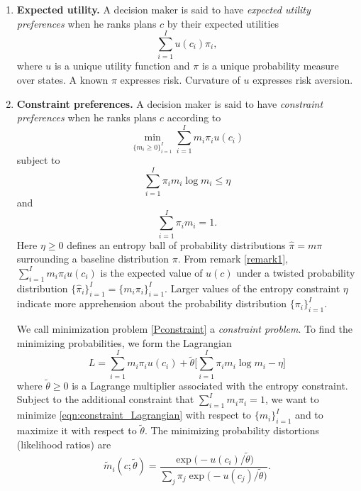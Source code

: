 \begin{enumerate}
\item\textbf{Expected utility.}
A decision maker is said to have \textit{expected
utility preferences} when he  ranks plans $c$ by  their expected utilities
\[ \sum_{i=1}^I u(c_i) \pi_i,  \]
where $u$ is a  unique utility function and $\pi$ is a  unique probability measure over states.  A known $\pi$ expresses risk.  Curvature of $u$ expresses risk aversion.

\item\textbf{Constraint preferences.} A decision maker  is said to have \textit{constraint preferences} when he ranks plans $c$ according to
\begin{equation}\label{Pconstraint}  \min_{\{m_i \geq 0\}_{i=1}^I}  \sum_{i=1}^I m_i\pi_i  u(c_i) \end{equation}
 subject to
\[\sum_{i=1}^I \pi_i m_i \log m_i \leq \eta \]
and
\[ \sum_{i=1}^I \pi_i m_i = 1 .\]
Here $\eta \geq 0$ defines an entropy ball of probability distributions $\hat \pi = m \pi$ surrounding
a baseline distribution $\pi$. From remark \ref{remark1},
$  \sum_{i=1}^I m_i\pi_i  u(c_i) $ is the expected value of $u(c)$ under a twisted  probability distribution $\{\hat \pi_i\}_{i=1}^I = \{m_i \pi_i\}_{i=1}^I$. Larger values of the entropy constraint $\eta$
 indicate more apprehension about the probability distribution $\{\pi_i\}_{i=1}^I$.

We call  minimization problem \eqref{Pconstraint} a \textit{constraint problem}. To find
 the minimizing probabilities, we  form the
Lagrangian
\begin{equation}\label{eqn:constraint_Lagrangian}
L = \sum_{i=1}^I m_i \pi_i u(c_i) +  \tilde \theta\bigl[\sum_{i=1}^I \pi_i m_i \log m_i - \eta \bigr]
\end{equation}
where $\tilde \theta \geq 0$ is a Lagrange multiplier associated with the entropy constraint.  Subject to the additional constraint that
$\sum_{i=1}^I m_i  \pi_i =1$, we want to  minimize \eqref{eqn:constraint_Lagrangian}
with respect to $\{m_i\}_{i=1}^I$ and to maximize it with respect to $\tilde \theta$.
The minimizing probability distortions (likelihood ratios) are %
 \begin{equation}\label{eqn:Murphys_law_2} \tilde m_i(c;\tilde \theta) 
 = \frac{ \exp \bigl(- u(c_i)/\tilde \theta\bigr)}{\sum_j \pi_j \exp \bigl(- u(c_j)/\tilde \theta\bigr) } .\end{equation}
  

\end{enumerate}
